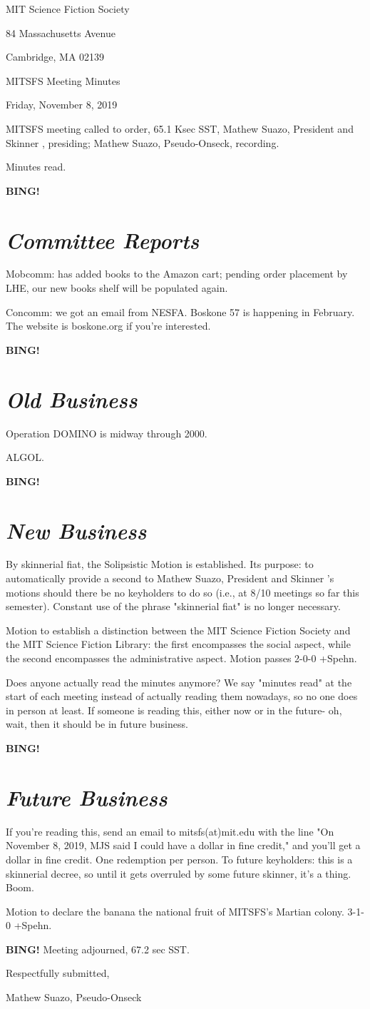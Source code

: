\documentclass[10pt]{article}
\newcommand{\bing}{{\bf BING!} }
\newcommand{\goto}[1]{\bing \vskip 12pt \section*{{\em{#1}}}}
\newcommand{\skinner}{Mathew Suazo, President and Skinner }
\newcommand{\onseck}{Mathew Suazo, Pseudo-Onseck}
\newcommand{\meetingdate}{Friday, November 8, 2019 }
\begin{document}
\begin{center}

MIT Science Fiction Society

84 Massachusetts Avenue

Cambridge, MA 02139

\vspace{12pt}

MITSFS Meeting Minutes

\meetingdate

\end{center}

\vspace{18pt}

\setlength{\parskip}{6pt}

\noindent
MITSFS meeting called to order, 65.1 Ksec SST,
\skinner, presiding; \onseck, recording.

Minutes read.

\goto{Committee Reports}

Mobcomm: has added books to the Amazon cart; pending order placement by LHE, our new books shelf will be populated again.

Concomm: we got an email from NESFA. Boskone 57 is happening in February. The website is boskone.org if you're interested.

\goto{Old Business}

Operation DOMINO is midway through 2000.

ALGOL.

\goto{New Business}

By skinnerial fiat, the Solipsistic Motion is established. Its purpose: to automatically provide a second to \skinner's motions should there be no keyholders to do so (i.e., at 8/10 meetings so far this semester). Constant use of the phrase "skinnerial fiat" is no longer necessary.

Motion to establish a distinction between the MIT Science Fiction Society and the MIT Science Fiction Library: the first encompasses the social aspect, while the second encompasses the administrative aspect. Motion passes 2-0-0 +Spehn.

Does anyone actually read the minutes anymore? We say "minutes read" at the start of each meeting instead of actually reading them nowadays, so no one does in person at least. If someone is reading this, either now or in the future- oh, wait, then it should be in future business.

\goto{Future Business}

If you're reading this, send an email to mitsfs(at)mit.edu with the line "On November 8, 2019, MJS said I could have a dollar in fine credit," and you'll get a dollar in fine credit. One redemption per person. To future keyholders: this is a skinnerial decree, so until it gets overruled by some future skinner, it's a thing. Boom.

Motion to declare the banana the national fruit of MITSFS's Martian colony. 3-1-0 +Spehn.

\bing
\noindent
Meeting adjourned, 67.2 sec SST.

\vspace{18pt}

\centerline{Respectfully submitted,}
\centerline{\onseck}
\end{document}
